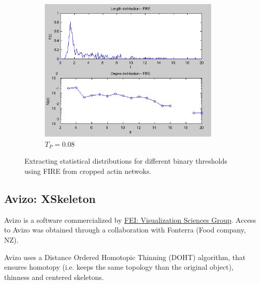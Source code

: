 \begin{figure}[H]
  \begin{subfigure}{0.5\textwidth}
    \includegraphics[width=0.95\textwidth]{Figures/chapter-image/fire/fire008histo.png}%
    \caption{$T_P=0.08$}
    \label{firehisto008}
  \end{subfigure}
\caption[Distributions of length and degree in FIRE]{Extracting statistical
distributions for different binary thresholds using FIRE from cropped
actin netwoks.}
\label{fig:fire_histograms}
\end{figure}


\subsection{Avizo: XSkeleton}
\label{sub:avizo}
 Avizo is a software commercialized by
 \href{http://www.vsg3d.com/avizo/overview}{FEI: Visualization Sciences Group}.
Access to Avizo was obtained through a collaboration with Fonterra (Food company,
NZ).

Avizo uses a Distance Ordered Homotopic Thinning (DOHT) algorithm, that ensures homotopy (i.e. keeps the same topology than the original object),
thinness and centered skeletons.

